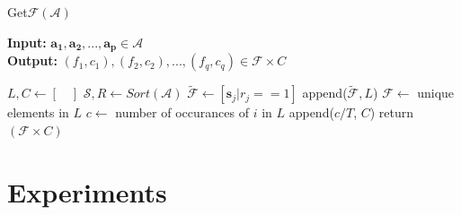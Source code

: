 \documentclass[conference]{IEEEtran}
\newcommand{\p}[1]{{\color{blue} Pdj: #1}}
\begin{document}
\begin{algorithm}
	\caption{ Get$\mathcal{F}$$(\mathcal{A})$ }
	\label{alg:f}
	\hspace*{\algorithmicindent} \textbf{Input: } $ \mathbf{a_1},\mathbf{a_2} ,..., \mathbf{a_p}\in \mathcal{A}$ \\
	\hspace*{\algorithmicindent} \textbf{Output: } $ (f_1,c_1), (f_2, c_2), ..., (f_q,c_q) \in \mathcal{F} \times C  $
	\begin{algorithmic}[1] 
		\State $L, C \leftarrow [ \quad ]$ 
		\State $\mathcal{S}, R \leftarrow Sort(\mathcal{A})$
		\State $\tilde{\mathcal{F}} \leftarrow [\mathbf{s}_j | r_j == 1 ]$ 
		\State append($\tilde{\mathcal{F}}, L $)
		\EndFor
		\State $\mathcal{F} \leftarrow $ unique elements in $L$ 
		\State $c \leftarrow$ number of occurances of $i$ in $L$ 
		\State append($c/T$, $C$)
		\EndFor
		\State return $(\mathcal{F} \times C)$
              \end{algorithmic}
\end{algorithm}

\section{Experiments}
\label{sec:exp}
\end{document}
